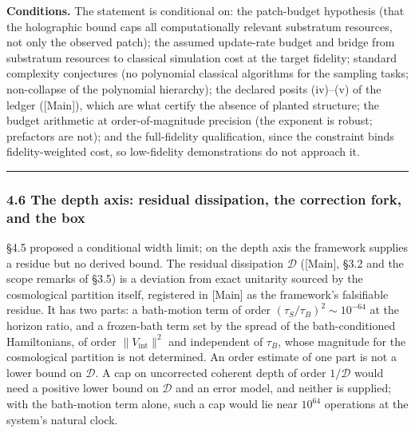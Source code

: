 \documentclass[
]{article}
\begin{document}
\textbf{Conditions.} The statement is conditional on: the patch-budget
hypothesis (that the holographic bound caps all computationally relevant
substratum resources, not only the observed patch); the assumed
update-rate budget and bridge from substratum resources to classical
simulation cost at the target fidelity; standard complexity conjectures
(no polynomial classical algorithms for the sampling tasks; non-collapse
of the polynomial hierarchy); the declared posits (iv)--(v) of the
ledger ({[}Main{]}), which are what certify the absence of planted
structure; the budget arithmetic at order-of-magnitude precision (the
exponent is robust; prefactors are not); and the full-fidelity
qualification, since the constraint binds fidelity-weighted cost, so
low-fidelity demonstrations do not approach it.

\begin{center}\rule{0.5\linewidth}{0.5pt}\end{center}

\hypertarget{the-depth-axis-residual-dissipation-the-correction-fork-and-the-box}{%
\subsubsection{4.6 The depth axis: residual dissipation, the correction
fork, and the
box}\label{the-depth-axis-residual-dissipation-the-correction-fork-and-the-box}}

§4.5 proposed a conditional width limit; on the depth axis the framework
supplies a residue but no derived bound. The residual dissipation
\(\mathcal{D}\) ({[}Main{]}, §3.2 and the scope remarks of §3.5) is a
deviation from exact unitarity sourced by the cosmological partition
itself, registered in {[}Main{]} as the framework's falsifiable residue.
It has two parts: a bath-motion term of order
\((\tau_S/\tau_B)^2 \sim 10^{-64}\) at the horizon ratio, and a
frozen-bath term set by the spread of the bath-conditioned Hamiltonians,
of order \(\|V_{\text{int}}\|^2\) and independent of \(\tau_B\), whose
magnitude for the cosmological partition is not determined. An order
estimate of one part is not a lower bound on \(\mathcal{D}\). A cap on
uncorrected coherent depth of order \(1/\mathcal{D}\) would need a
positive lower bound on \(\mathcal{D}\) and an error model, and neither
is supplied; with the bath-motion term alone, such a cap would lie near
\(10^{64}\) operations at the system's natural clock.
\end{document}
